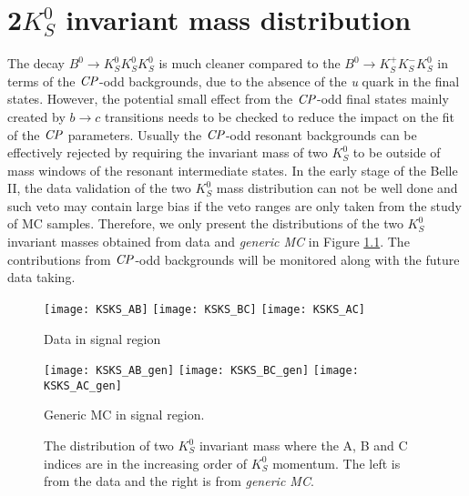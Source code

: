\chapter{2$K_S^0$ invariant mass distribution}
The decay $B^0 \to K_S^0  K_S^0  K_S^0$ is much cleaner compared to the $B^0 \to K_S^+  K_S^-  K_S^0$ in terms of the $\it{CP}$-odd backgrounds, due to the absence of the \textit{u} quark in the final states. However, the potential small effect from the $\it{CP}$-odd final states mainly created by $b \to c$ transitions needs to be checked to reduce the impact on the fit of the $\it{CP}$ parameters. Usually the $\it{CP}$-odd resonant backgrounds can be effectively rejected by requiring the invariant mass of two $K_S^0$ to be outside of mass windows of the resonant intermediate states. In the early stage of the Belle II, the data validation of the two $K_S^0$ mass distribution can not be well done and such veto may contain large bias if the veto ranges are only taken from the study of MC samples. Therefore, we only present the distributions of the two $K_S^0$ invariant masses obtained from data and \textit{generic MC} in Figure \ref{fig:2ksinvm}. The contributions from $\it{CP}$-odd backgrounds will be monitored along with the future data taking.
\begin{figure}[htpb]
\begin{minipage}{0.5\linewidth}
\centering
\texttt{[image: KSKS\_AB]}
\texttt{[image: KSKS\_BC]}
\texttt{[image: KSKS\_AC]}
\caption{Data in signal region}
\end{minipage}
\begin{minipage}{0.5\linewidth}
\centering
\texttt{[image: KSKS\_AB\_gen]}
\texttt{[image: KSKS\_BC\_gen]}
\texttt{[image: KSKS\_AC\_gen]}
\caption{Generic MC in signal region.}
\end{minipage}
\caption{The distribution of two $K_S^0$ invariant mass where the A, B and C indices are in the increasing order of $K_S^0$ momentum. The left is from the data and the right is from \textit{generic MC}.}
\label{fig:2ksinvm}
\end{figure}



